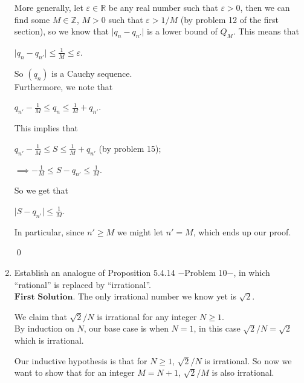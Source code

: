\documentclass{article}
\theoremstyle{remark}
\begin{document}
\begin{enumerate}
            More generally, let $\varepsilon \in \mathbb{R}$ be any real number such that $\varepsilon > 0$, then we can find some $M \in \mathbb{Z}$, $M>0$ such 
            that $\varepsilon > 1/M$ (by problem 12 of the first section), so we know that $\vert q_n - q_{n'}\vert$ is a lower bound 
            of $Q_M$. This means that 
            \begin{center}
                $\displaystyle \vert q_n - q_{n'}\vert \leq \frac{1}{M} \leq \varepsilon$.
            \end{center}
            So $(q_n)$ is a Cauchy sequence.\\
            Furthermore, we note that
            \begin{center}
                $\displaystyle q_{n'} -\frac{1}{M} \leq q_n \leq \frac{1}{M} + q_{n'}$.
            \end{center}
            This implies that 
            \begin{center}
                $\displaystyle q_{n'} -\frac{1}{M} \leq S \leq \frac{1}{M} + q_{n'}$ (by problem 15);
            \end{center}
            \begin{center}
                $\displaystyle \implies -\frac{1}{M} \leq S - q_{n'} \leq \frac{1}{M}$.
            \end{center}
            So we get that 
            \begin{center}
                $\displaystyle \vert S - q_{n'}\vert \leq \frac{1}{M}$.
            \end{center}
            In particular, since $n' \geq M$ we might let $n' = M$, which ends up our proof. 
            \begin{flushright}
                \qed
            \end{flushright}
            \item Establish an analogue of Proposition 5.4.14 $-$Problem 10$-$, in which “rational” is replaced by “irrational”.\\
            $\textbf{First Solution.}$
            The only irrational number we know yet is $\sqrt{2}$.
            
            We claim that $\sqrt{2}/N$ is irrational for any integer $N \geq 1$.\\
            By induction on $N$, our base case is when $N = 1$, in this case $\sqrt{2}/N = \sqrt{2}$ which 
            is irrational.
            
            Our inductive hypothesis is that for $N \geq 1$, $\sqrt{2}/N$ is irrational.
            So now we want to show that for an integer $M = N+1$, $\sqrt{2}/M$ is also irrational.
            

\end{enumerate}
\end{document}
